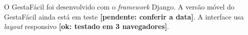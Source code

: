 \documentclass[a4paper]{article}
\newcommand{\sistema}{\textsf{GestaFácil}}
\newcommand{\estrangeiro}[1]{\emph{#1}}
\newcommand{\revisar}[2][pendente]{\textbf{[#1: #2]}}
\begin{document}
O \sistema{} foi desenvolvido com o \estrangeiro{framework} Django. A versão
móvel do \sistema{} ainda está em teste \revisar{conferir a data}. A interface
usa \estrangeiro{layout} responsivo \revisar[ok]{testado em 3 navegadores}.
\end{document}
